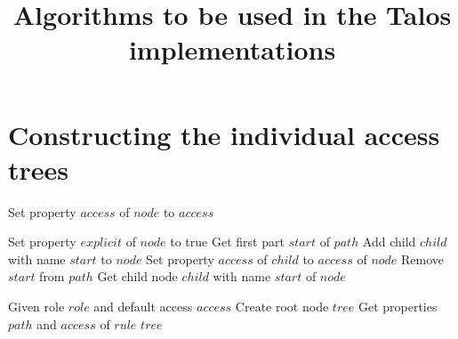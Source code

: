 \documentclass{report}
\title{Algorithms to be used in the Talos implementations}
\begin{document}
	\maketitle

	\tableofcontents

	\chapter{Constructing the individual access trees}
	\begin{algorithm}
		\begin{algorithmic}[1]
				\State Set property $ access $ of $ node $ to $ access $
						\State {}
					\EndIf
				\EndFor
			\EndFunction

					\State Set property $ explicit $ of $ node $ to true
					\State {}
					\State \Return
				\EndIf
				\State Get first part $ start $ of $ path $
					\State Add child $ child $ with name $ start $ to $ node $
					\State Set property $ access $ of $ child $ to $ access $ of $ node $
				\EndIf
				\State Remove $ start $ from $ path $
				\State Get child node $ child $ with name $ start $ of $ node $
				\State {}
			\EndFunction

			\State Given role $ role $ and default access $ access $ 
			\State Create root node $ tree $
				\State Get properties $ path $ and $ access $ of $ rule $
				\State {}
			\EndFor
			\State \Return $ tree $
		\end{algorithmic}
	\end{algorithm}
\end{document}
